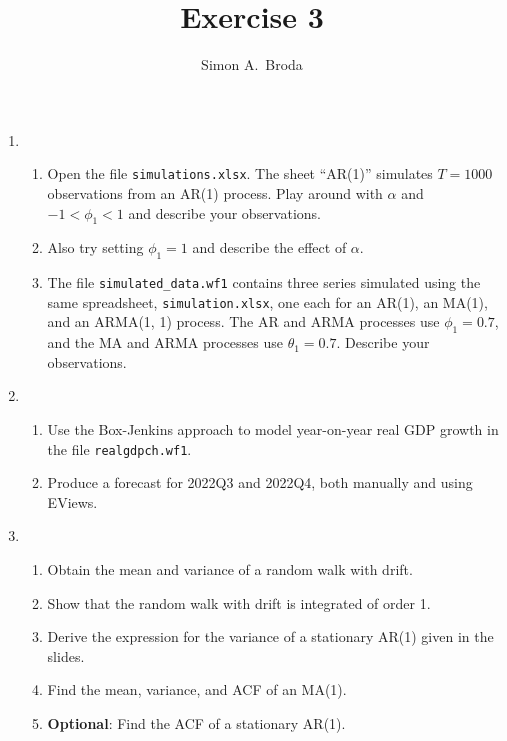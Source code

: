 \documentclass[11pt, a4paper]{article}
\begin{document}
\title{Exercise 3}
\author{Simon A.\ Broda}
\date{}
\maketitle

\begin{enumerate}
\item
\begin{enumerate}
\item Open the file \texttt{simulations.xlsx}. The sheet ``AR(1)'' simulates $T=1000$ observations from an AR(1) process. Play around with $\alpha$ and $-1<\phi_1<1$ and describe your observations.
\item Also try setting $\phi_1=1$ and describe the effect of $\alpha$.
\item The file \verb+simulated_data.wf1+ contains three series simulated using the same spreadsheet, \texttt{simulation.xlsx}, one each for an AR(1), an MA(1), and an ARMA(1, 1) process. The AR and ARMA processes use $\phi_1=0.7$, and the MA and ARMA processes use $\theta_1=0.7$. Describe your observations.
\end{enumerate}
\item
\begin{enumerate}
\item Use the Box-Jenkins approach to model year-on-year real GDP growth in the file \linebreak\texttt{realgdpch.wf1}.
\item Produce a forecast for 2022Q3 and 2022Q4, both manually and using EViews.
\end{enumerate}
\item
\begin{enumerate}
\item Obtain the mean and variance of a random walk with drift.
\item Show that the random walk with drift is integrated of order 1.
\item Derive the expression for the variance of a stationary AR(1) given in the slides.
\item Find the mean, variance, and ACF of an MA(1).
\item \textbf{Optional}: Find the ACF of a stationary AR(1).
\end{enumerate}
\end{enumerate}
\end{document}
